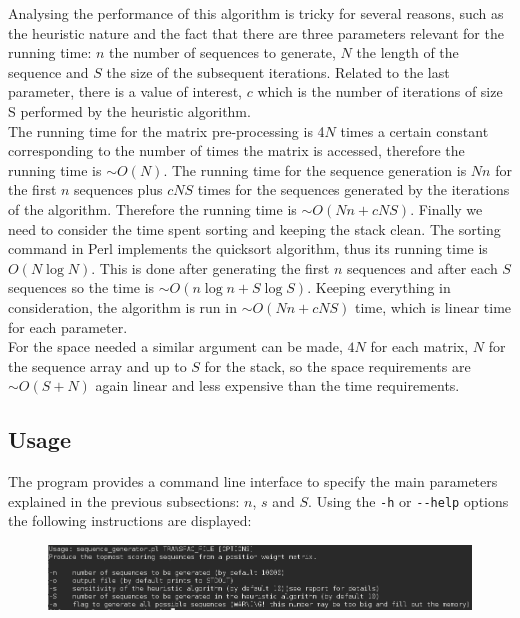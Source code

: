 \documentclass[10pt]{article}
\begin{document}
Analysing the performance of this algorithm is tricky for several reasons, such as the heuristic nature and the fact that there are three parameters relevant for the running time: $n$ the number of sequences to generate, $N$ the length of the sequence and $S$ the size of the subsequent iterations. Related to the last parameter, there is a value of interest, $c$ which is the number of iterations of size S performed by the heuristic algorithm.\\

The running time for the matrix pre-processing is 4$N$ times a certain constant corresponding to the number of times the matrix is accessed, therefore the running time is $\sim O(N)$. The running time for the sequence generation is $Nn$ for the first $n$ sequences plus $cNS$ times for the sequences generated by the iterations of the algorithm. Therefore the running time is $\sim O(Nn + cNS)$. Finally we need to consider the time spent sorting and keeping the stack clean. The sorting command in Perl implements the quicksort algorithm, thus its running time is $O(N\log N)$. This is done after generating the first $n$ sequences and after each $S$ sequences so the time is $\sim O(n\log n + S\log S)$. Keeping everything in consideration, the algorithm is run in $\sim O(Nn +cNS)$ time, which is linear time for each parameter.\\

For the space needed a similar argument can be made, $4N$ for each matrix, $N$ for the sequence array and up to $S$ for the stack, so the space requirements are $\sim O(S + N)$ again linear and less expensive than the time requirements.\\

\subsection{Usage} 
The program provides a command line interface to specify the main parameters explained in the previous subsections: $n$, $s$ and $S$. Using the \verb|-h| or \verb|--help| options the following instructions are displayed:\\
\begin{figure}[h]
\centering
\includegraphics[scale=0.45]{usage.png}
\end{figure}
\end{document}
